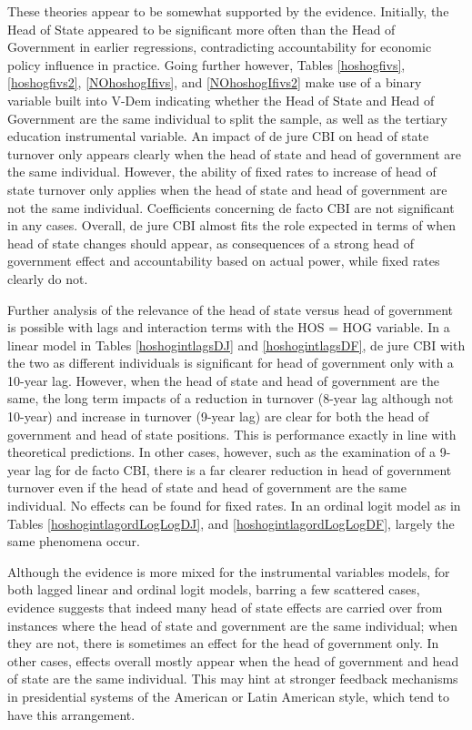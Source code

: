 \documentclass{article}
\begin{document}
    These theories appear to be somewhat supported by the evidence. Initially, the Head of State appeared to be significant more often than the Head of Government in earlier regressions, contradicting accountability for economic policy influence in practice. Going further however, Tables \ref{hoshogfivs}, \ref{hoshogfivs2}, \ref{NOhoshogIfivs}, and \ref{NOhoshogIfivs2} make use of a binary variable built into V-Dem indicating whether the Head of State and Head of Government are the same individual to split the sample, as well as the tertiary education instrumental variable.  An impact of de jure CBI on head of state turnover only appears clearly when the head of state and head of government are the same individual. However, the ability of fixed rates to increase of head of state turnover only applies when the head of state and head of government are not the same individual. Coefficients concerning de facto CBI are not significant in any cases. Overall, de jure CBI almost fits the role expected in terms of when head of state changes should appear, as consequences of a strong head of government effect and accountability based on actual power, while fixed rates clearly do not. 

    Further analysis of the relevance of the head of state versus head of government is possible with lags and interaction terms with the HOS = HOG variable. In a linear model in Tables \ref{hoshogintlagsDJ} and \ref{hoshogintlagsDF}, de jure CBI with the two as different individuals is significant for head of government only with a 10-year lag. However, when the head of state and head of government are the same, the long term impacts of a reduction in turnover (8-year lag although not 10-year) and increase in turnover (9-year lag) are clear for both the head of government and head of state positions. This is performance exactly in line with theoretical predictions. In other cases, however, such as the examination of a 9-year lag for de facto CBI, there is a far clearer reduction in head of government turnover even if the head of state and head of government are the same individual. No effects can be found for fixed rates. In an ordinal logit model as in Tables \ref{hoshogintlagordLogLogDJ}, and \ref{hoshogintlagordLogLogDF}, largely the same phenomena occur. 

    Although the evidence is more mixed for the instrumental variables models, for both lagged linear and ordinal logit models, barring a few scattered cases, evidence suggests that indeed many head of state effects are carried over from instances where the head of state and government are the same individual; when they are not, there is sometimes an effect for the head of government only. In other cases, effects overall mostly appear when the head of government and head of state are the same individual. This may hint at stronger feedback mechanisms in presidential systems of the American or Latin American style, which tend to have this arrangement.
\end{document}
